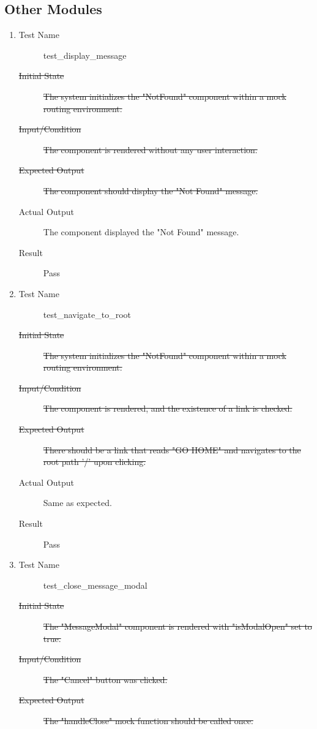 \documentclass[12pt, titlepage]{article}
\begin{document}
\subsection{Other Modules}
\begin{enumerate}[UT-OT1]
\item \label{UT-OT1}
  \begin{description}
  \item[Test Name] test\_display\_message
  \item[\sout{Initial State}]\sout{ The system initializes the "NotFound" component within a
    mock routing environment.
  }\item[\sout{Input/Condition}]\sout{ The component is rendered without any user interaction.
  }\item[\sout{Expected Output}]\sout{ The component should display the "Not Found" message.
  }\item[Actual Output] The component displayed the "Not Found" message.
  \item[Result] Pass
  \end{description}
\item \label{UT-OT2}
  \begin{description}
  \item[Test Name] test\_navigate\_to\_root
  \item[\sout{Initial State}]\sout{ The system initializes the "NotFound" component within a
    mock routing environment.
  }\item[\sout{Input/Condition}]\sout{ The component is rendered, and the existence of a link
    is checked.
  }\item[\sout{Expected Output}]\sout{ There should be a link that reads "GO HOME" and
    navigates to the root path '/' upon clicking.
  }\item[Actual Output] Same as expected.
  \item[Result] Pass
  \end{description}
\item \label{UT-OT3}
  \begin{description}
  \item[Test Name] test\_close\_message\_modal
  \item[\sout{Initial State}]\sout{ The "MessageModal" component is rendered with
    "isModalOpen" set to true.
  }\item[\sout{Input/Condition}]\sout{ The "Cancel" button was clicked.
  }\item[\sout{Expected Output}]\sout{ The "handleClose" mock function should be called once.
}
\end{description}
\end{enumerate}
\end{document}
